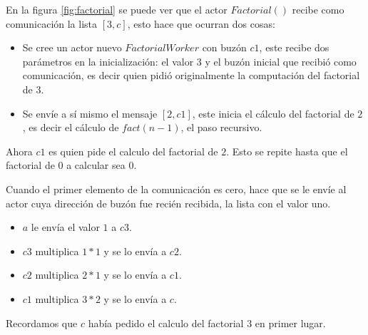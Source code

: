 En la figura \ref{fig:factorial} se puede ver que el actor $Factorial()$ recibe como comunicación la lista $[3,c]$, esto hace que ocurran dos cosas:

\begin{itemize}
\item Se cree un actor nuevo $FactorialWorker$ con buzón $c1$, este recibe dos parámetros en la inicialización: el valor $3$ y el buzón inicial que recibió como comunicación, es decir quien pidió originalmente la computación del factorial de $3$.

\item Se envíe a sí mismo el mensaje $[2,c1]$, este inicia el cálculo del factorial de $2$, es decir el cálculo de $fact(n-1)$, el paso recursivo.
\end{itemize}

Ahora $c1$ es quien pide el calculo del factorial de $2$. Esto se repite hasta que el factorial de $0$ a calcular sea $0$.

Cuando el primer elemento de la comunicación es cero, hace que se le envíe al actor cuya dirección de buzón fue recién recibida, la lista con el valor uno. 

\begin{itemize}
\item $a$ le envía el valor $1$ a $c3$.
\item $c3$ multiplica $1*1$ y se lo envía a $c2$.
\item $c2$ multiplica $2*1$ y se lo envía a $c1$.
\item $c1$ multiplica $3*2$ y se lo envía a $c$.
\end{itemize}

Recordamos que $c$ había pedido el calculo del factorial $3$ en primer lugar.

